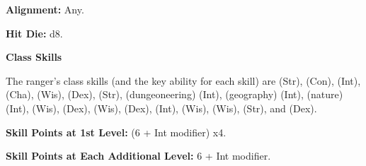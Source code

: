 
\textbf{Alignment:} Any.

\textbf{Hit Die:} d8.

\textbf{Class Skills}

The ranger's class skills (and the key ability for each skill) are  (Str), 
 (Con),  (Int),  (Cha),  (Wis),  (Dex), 
 (Str),  (dungeoneering) (Int),  (geography) (Int),  
(nature) (Int),  (Wis),  (Dex),  (Wis),  (Dex), 
 (Int),  (Wis),  (Wis),  (Str), and  (Dex).

\textbf{Skill Points at 1st Level:} (6 + Int modifier) x4.

\textbf{Skill Points at Each Additional Level:} 6 + Int modifier.

